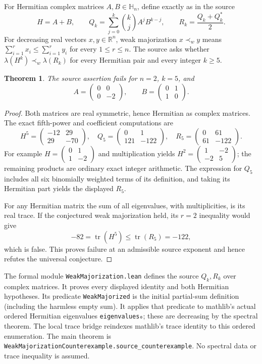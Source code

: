 \documentclass[11pt]{article}
\newtheorem{theorem}{Theorem}
\newcommand{\tr}{\operatorname{tr}}
\begin{document}
For Hermitian complex matrices $A,B\in\mathbb H_n$, define exactly as in the source
\[
 H=A+B,\qquad Q_k=\sum_{j=0}^k\binom{k}{j}A^jB^{k-j},\qquad R_k=\frac{Q_k+Q_k^*}{2}.
\]
For decreasing real vectors $x,y\in\mathbb R^n$, weak majorization $x\prec_w y$ means $\sum_{i=1}^r x_i\leq\sum_{i=1}^r y_i$ for every $1\leq r\leq n$. The source asks whether $\lambda(H^k)\prec_w\lambda(R_k)$ for every Hermitian pair and every integer $k\geq5$.
\begin{theorem}
The source assertion fails for $n=2$, $k=5$, and
\[
 A=\begin{pmatrix}0&0\\0&-2\end{pmatrix},\qquad
 B=\begin{pmatrix}0&1\\1&0\end{pmatrix}.
\]
\end{theorem}
\begin{proof}
Both matrices are real symmetric, hence Hermitian as complex matrices. The exact fifth-power and coefficient computations are
\[
 H^5=\begin{pmatrix}-12&29\\29&-70\end{pmatrix},\quad
 Q_5=\begin{pmatrix}0&1\\121&-122\end{pmatrix},\quad
 R_5=\begin{pmatrix}0&61\\61&-122\end{pmatrix}.
\]
For example $H=\left(\begin{smallmatrix}0&1\\1&-2\end{smallmatrix}\right)$ and multiplication yields $H^2=\left(\begin{smallmatrix}1&-2\\-2&5\end{smallmatrix}\right)$; the remaining products are ordinary exact integer arithmetic. The expression for $Q_5$ includes all six binomially weighted terms of its definition, and taking its Hermitian part yields the displayed $R_5$.

For any Hermitian matrix the sum of all eigenvalues, with multiplicities, is its real trace. If the conjectured weak majorization held, its $r=2$ inequality would give
\[
 -82=\tr(H^5)\leq\tr(R_5)=-122,
\]
which is false. This proves failure at an admissible source exponent and hence refutes the universal conjecture.
\end{proof}
The formal module \texttt{WeakMajorization.lean} defines the source $Q_k,R_k$ over complex matrices. It proves every displayed identity and both Hermitian hypotheses. Its predicate \texttt{WeakMajorized} is the initial partial-sum definition (including the harmless empty sum). It applies that predicate to mathlib's actual ordered Hermitian eigenvalues \texttt{eigenvalues₀}; these are decreasing by the spectral theorem. The local trace bridge reindexes mathlib's trace identity to this ordered enumeration. The main theorem is \texttt{WeakMajorizationCounterexample.source\_counterexample}. No spectral data or trace inequality is assumed.
\end{document}
